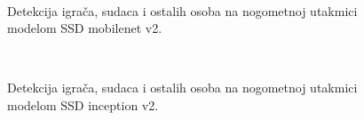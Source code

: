 \begin{figure}[h]
\begin{center}
 \\
\caption{Detekcija igrača, sudaca i ostalih osoba na nogometnoj utakmici modelom SSD mobilenet v2.}
\label{nogomet_ssd_mobilenet}
\end{center}
\end{figure}

\begin{figure}[h]
\begin{center}
 \\
\caption{Detekcija igrača, sudaca i ostalih osoba na nogometnoj utakmici modelom SSD inception v2.}
\label{nogomet_ssd_inception}
\end{center}
\end{figure}

